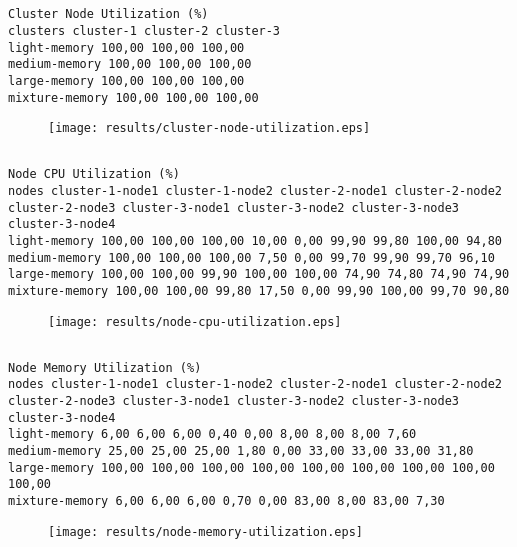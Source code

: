 \documentclass{elsart}
\begin{document}
\subsection{}

\begin{lstlisting}[caption={}]
Cluster Node Utilization (%)
clusters cluster-1 cluster-2 cluster-3
light-memory 100,00 100,00 100,00
medium-memory 100,00 100,00 100,00
large-memory 100,00 100,00 100,00
mixture-memory 100,00 100,00 100,00
\end{lstlisting}

\begin{figure}[ht]
\centering
\texttt{[image: results/cluster-node-utilization.eps]}
\caption{}\label{fig:cluster-node-utilization.eps}
\end{figure}

\subsection{}

\begin{lstlisting}[caption={}]
Node CPU Utilization (%)
nodes cluster-1-node1 cluster-1-node2 cluster-2-node1 cluster-2-node2 cluster-2-node3 cluster-3-node1 cluster-3-node2 cluster-3-node3 cluster-3-node4
light-memory 100,00 100,00 100,00 10,00 0,00 99,90 99,80 100,00 94,80
medium-memory 100,00 100,00 100,00 7,50 0,00 99,70 99,90 99,70 96,10
large-memory 100,00 100,00 99,90 100,00 100,00 74,90 74,80 74,90 74,90
mixture-memory 100,00 100,00 99,80 17,50 0,00 99,90 100,00 99,70 90,80
\end{lstlisting}

\begin{figure}[ht]
\centering
\texttt{[image: results/node-cpu-utilization.eps]}
\caption{}\label{fig:node-cpu-utilization.eps}
\end{figure}

\subsection{}

\begin{lstlisting}[caption={}]
Node Memory Utilization (%)
nodes cluster-1-node1 cluster-1-node2 cluster-2-node1 cluster-2-node2 cluster-2-node3 cluster-3-node1 cluster-3-node2 cluster-3-node3 cluster-3-node4
light-memory 6,00 6,00 6,00 0,40 0,00 8,00 8,00 8,00 7,60
medium-memory 25,00 25,00 25,00 1,80 0,00 33,00 33,00 33,00 31,80
large-memory 100,00 100,00 100,00 100,00 100,00 100,00 100,00 100,00 100,00
mixture-memory 6,00 6,00 6,00 0,70 0,00 83,00 8,00 83,00 7,30
\end{lstlisting}

\begin{figure}[ht]
\centering
\texttt{[image: results/node-memory-utilization.eps]}
\caption{}\label{fig:node-memory-utilization.eps}
\end{figure}
\end{document}
